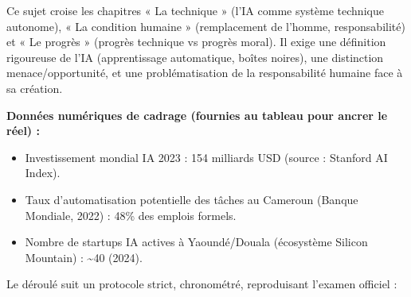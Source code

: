 \documentclass[11pt]{article}
\newcounter{popsec}
\newcounter{popsub}
\newcommand{\courssub}[1]{%
  \stepcounter{popsub}%
  \par\vspace{9pt}\noindent{\popxbold\fontsize{11.5}{13}\selectfont\color{popink}{\color{poporange}\thepopsec.\thepopsub}\hspace{6pt}#1}\par\nopagebreak\vspace{4pt}
}
\begin{document}
Ce sujet croise les chapitres « La technique » (l'IA comme système technique autonome), « La condition humaine » (remplacement de l'homme, responsabilité) et « Le progrès » (progrès technique vs progrès moral). Il exige une définition rigoureuse de l'IA (apprentissage automatique, boîtes noires), une distinction menace/opportunité, et une problématisation de la responsabilité humaine face à sa création.

\textbf{Données numériques de cadrage (fournies au tableau pour ancrer le réel) :}
\begin{itemize}
    \item Investissement mondial IA 2023 : \num{154} milliards USD (source : Stanford AI Index).
    \item Taux d'automatisation potentielle des tâches au Cameroun (Banque Mondiale, 2022) : \num{48}\% des emplois formels.
    \item Nombre de startups IA actives à Yaoundé/Douala (écosystème Silicon Mountain) : \textasciitilde 40 (2024).
\end{itemize}

\courssub{Consignes}
Le déroulé suit un protocole strict, chronométré, reproduisant l'examen officiel :
\end{document}
